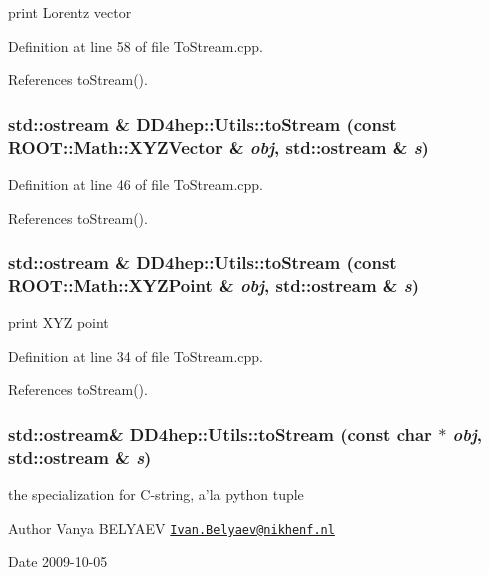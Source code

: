 print Lorentz vector 

Definition at line 58 of file ToStream.cpp.

References toStream().\hypertarget{namespace_d_d4hep_1_1_utils_ad01ecddf10c1ce2ef7593b0a01516898}{
\subsubsection[{toStream}]{\setlength{\rightskip}{0pt plus 5cm}std::ostream \& DD4hep::Utils::toStream (const ROOT::Math::XYZVector \& {\em obj}, \/  std::ostream \& {\em s})}}
\label{namespace_d_d4hep_1_1_utils_ad01ecddf10c1ce2ef7593b0a01516898}


Definition at line 46 of file ToStream.cpp.

References toStream().\hypertarget{namespace_d_d4hep_1_1_utils_a2a135f6ca6327240ccb6a2f796c6fc49}{
\subsubsection[{toStream}]{\setlength{\rightskip}{0pt plus 5cm}std::ostream \& DD4hep::Utils::toStream (const ROOT::Math::XYZPoint \& {\em obj}, \/  std::ostream \& {\em s})}}
\label{namespace_d_d4hep_1_1_utils_a2a135f6ca6327240ccb6a2f796c6fc49}


print XYZ point 

Definition at line 34 of file ToStream.cpp.

References toStream().\hypertarget{namespace_d_d4hep_1_1_utils_a0e52adf037edd29df048973406fc2554}{
\subsubsection[{toStream}]{\setlength{\rightskip}{0pt plus 5cm}std::ostream\& DD4hep::Utils::toStream (const char $\ast$ {\em obj}, \/  std::ostream \& {\em s})}}
\label{namespace_d_d4hep_1_1_utils_a0e52adf037edd29df048973406fc2554}
the specialization for C-\/string, a'la python tuple \begin{DoxyAuthor}{Author}
Vanya BELYAEV \href{mailto:Ivan.Belyaev@nikhenf.nl}{\tt Ivan.Belyaev@nikhenf.nl} 
\end{DoxyAuthor}
\begin{DoxyDate}{Date}
2009-\/10-\/05 
\end{DoxyDate}


